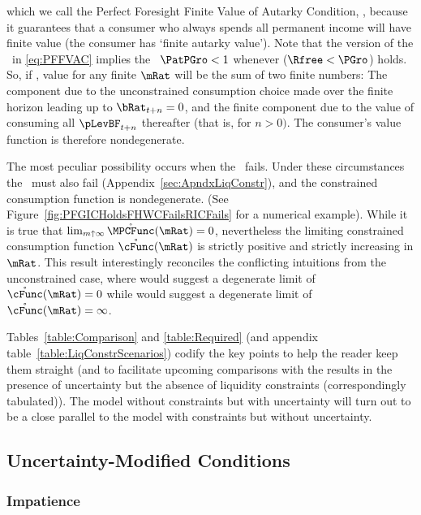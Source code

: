 \documentclass[BufferStockTheory]{subfiles}
\begin{document}
which we call the Perfect Foresight Finite Value of Autarky Condition, \PFFVAC, because it guarantees that a consumer who always spends all permanent income will have finite value (the consumer has `finite autarky value').  Note that the version of the \PFFVAC~in \eqref{eq:PFFVAC} implies the \PFGIC~$\PatPGro < 1$ whenever \cncl{\FHWC} ($\Rfree < \PGro$) holds.  So, if \cncl{\FHWC}, value for any finite $\mRat$ will be the sum of two finite numbers: The component due to the unconstrained consumption choice made over the finite horizon leading up to $\bRat_{t+n} = 0$, and the finite component due to the value of consuming all $\pLevBF_{t+n}$ thereafter (that is, for $n > 0)$.  The consumer's value function is therefore nondegenerate.

\hypertarget{RICandFHWCFail}{}
The most peculiar possibility occurs when the \RIC~fails.  Under these circumstances the \FHWC~must also fail (Appendix~\ref{sec:ApndxLiqConstr}), and the constrained consumption function is nondegenerate.  (See Figure~\ref{fig:PFGICHoldsFHWCFailsRICFails} for a numerical example).  While it is true that $\lim_{m \uparrow \infty}
\mathring{\MPCFunc}(\mRat) = 0$, nevertheless the limiting constrained
consumption function $\mathring{\cFunc}(\mRat)$ is strictly positive
and strictly increasing in $\mRat$.  This result interestingly
reconciles the conflicting intuitions from the unconstrained case,
where \cncl{\RIC} would suggest a degenerate limit of
$\mathring{\cFunc}(\mRat)=0$ while \cncl{\FHWC} would suggest a
degenerate limit of $\mathring{\cFunc}(\mRat)=\infty$.

Tables~\ref{table:Comparison} and \ref{table:Required} (and appendix
table~\ref{table:LiqConstrScenarios}) codify the key points to help
the reader keep them straight (and to facilitate upcoming comparisons
with the results in the presence of uncertainty
but the absence of liquidity constraints (correspondingly tabulated)).  The model without constraints but with uncertainty will turn out to be a close parallel to the model with constraints but without uncertainty.

\hypertarget{Uncertainty-Modified-Conditions}{}
\subsection{Uncertainty-Modified Conditions}
\subsubsection{Impatience}
\end{document}
